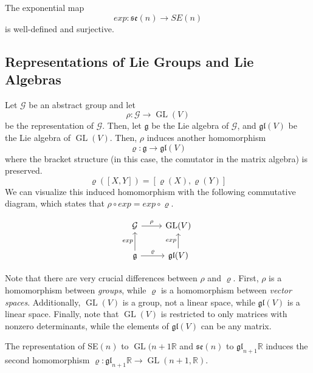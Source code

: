 \documentclass{article}
\DeclareMathOperator{\GL}{GL}
\begin{document}
      \begin{theorem}
        The exponential map
        \begin{equation}
          exp: \mathfrak{se}(n) \longrightarrow SE(n)
        \end{equation}
        is well-defined and surjective. 
      \end{theorem}

  \subsection{Representations of Lie Groups and Lie Algebras}

    Let $\mathcal{G}$ be an abstract group and let
    \begin{equation}
      \rho: \mathcal{G} \longrightarrow \GL(V)
    \end{equation}
    be the representation of $\mathcal{G}$. Then, let $\mathfrak{g}$ be the Lie algebra of $\mathcal{G}$, and $\mathfrak{gl}(V)$ be the Lie algebra of $\GL(V)$. Then, $\rho$ induces another homomorphism 
    \begin{equation}
      \varrho: \mathfrak{g} \longrightarrow \mathfrak{gl}(V)
    \end{equation}
    where the bracket structure (in this case, the comutator in the matrix algebra) is preserved. 
    \begin{equation}
      \varrho([X,Y]) = [\varrho(X), \varrho(Y)]
    \end{equation}
    We can visualize this induced homomorphism with the following commutative diagram, which states that $\rho \circ exp = exp \circ \varrho$. 

    \[\begin{tikzcd}
    \mathcal{G} \arrow{r}{\rho} & \GL(V)\\
    \mathfrak{g} \arrow{u}{exp} \arrow{r}{\varrho} & \mathfrak{gl}(V) \arrow{u}{exp}
    \end{tikzcd}\]

    Note that there are very crucial differences between $\rho$ and $\varrho$. First, $\rho$ is a homomorphism between \textit{groups}, while $\varrho$ is a homomorphism between \textit{vector spaces}. Additionally, $\GL(V)$ is a group, not a linear space, while $\mathfrak{gl}(V)$ is a linear space. Finally, note that $\GL(V)$ is restricted to only matrices with nonzero determinants, while the elements of $\mathfrak{gl}(V)$ can be any matrix. 

    \begin{example}
      The representation of SE$(n)$ to $\GL(n+1 \mathbb{R}$ and $\mathfrak{se}(n)$ to $\mathfrak{gl}_{n+1} \mathbb{R}$ induces the second homomorphism $\varrho: \mathfrak{gl}_{n+1} \mathbb{R} \longrightarrow \GL(n+1, \mathbb{R})$. 
    \end{example}
\end{document}
